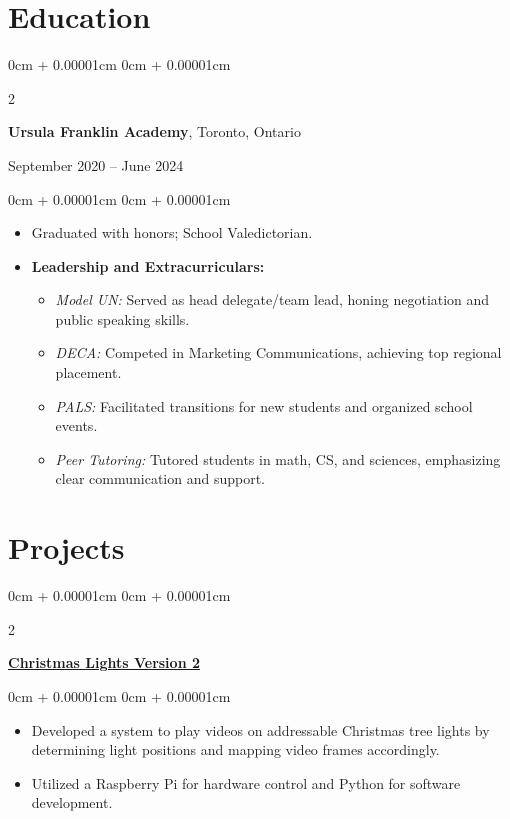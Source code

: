 \documentclass[10pt, letterpaper]{article}
\newenvironment{highlights}{
    \begin{itemize}[
        topsep=0.10cm,
        parsep=0.10cm,
        partopsep=0pt,
        itemsep=0pt,
        leftmargin=0cm + 10pt
    ]
}{
    \end{itemize}
}
\newenvironment{onecolentry}{
    \begin{adjustwidth}{
        0cm + 0.00001cm
    }{
        0cm + 0.00001cm
    }
}{
    \end{adjustwidth}
}
\newenvironment{twocolentry}[2][]{
    \onecolentry
    \def\secondColumn{#2}
    \setcolumnwidth{\fill, 5.5 cm} %
    \begin{paracol}{2}
}{
    \switchcolumn \raggedleft \secondColumn
    \end{paracol}
    \endonecolentry
}
\begin{document}
    \section{Education}
    \begin{twocolentry}{September 2020 – June 2024}
        \textbf{Ursula Franklin Academy}, Toronto, Ontario
    \end{twocolentry}
    \begin{onecolentry}
        \begin{highlights}
            \item Graduated with honors; School Valedictorian.
            \item \textbf{Leadership and Extracurriculars:}
            \begin{itemize}[leftmargin=15pt]
                \item \textit{Model UN:} Served as head delegate/team lead, honing negotiation and public speaking skills.
                \item \textit{DECA:} Competed in Marketing Communications, achieving top regional placement.
                \item \textit{PALS:} Facilitated transitions for new students and organized school events.
                \item \textit{Peer Tutoring:} Tutored students in math, CS, and sciences, emphasizing clear communication and support.
            \end{itemize}
        \end{highlights}
    \end{onecolentry}

    \section{Projects}
    \begin{twocolentry}{}
        \textbf{\href{https://blucardin.github.io/projects/christmas-lights-v2/}{Christmas Lights Version 2}}
    \end{twocolentry}
    \vspace{0.10cm}
    \begin{onecolentry}
        \begin{highlights}
            \item Developed a system to play videos on addressable Christmas tree lights by determining light positions and mapping video frames accordingly.
            \item Utilized a Raspberry Pi for hardware control and Python for software development.
        \end{highlights}
    \end{onecolentry}
\end{document}
